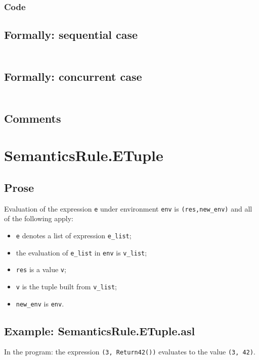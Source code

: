 \documentclass{book}
\begin{document}
  \subsubsection{Code}

  \subsection{Formally: sequential case}
  \begin{align}
  \end{align} 

  \subsection{Formally: concurrent case}
  \begin{align}
  \end{align} 

  \subsection{Comments}

\section{SemanticsRule.ETuple \label{sec:SemanticsRule.ETuple}}

  \subsection{Prose}
  Evaluation of the expression \texttt{e} under environment \texttt{env} is
  \texttt{(res,new\_env)} and all of the following apply:
  \begin{itemize}
  \item \texttt{e} denotes a list of expression \texttt{e\_list};
  \item the evaluation of \texttt{e\_list} in \texttt{env} is \texttt{v\_list};
  \item \texttt{res} is a value \texttt{v};
  \item \texttt{v} is the tuple built from \texttt{v\_list};
  \item \texttt{new\_env} is \texttt{env}.
  \end{itemize}

  \subsection{Example: SemanticsRule.ETuple.asl}
    In the program:
    the expression \texttt{(3, Return42())} evaluates to the value \texttt{(3, 42)}.
\end{document}
